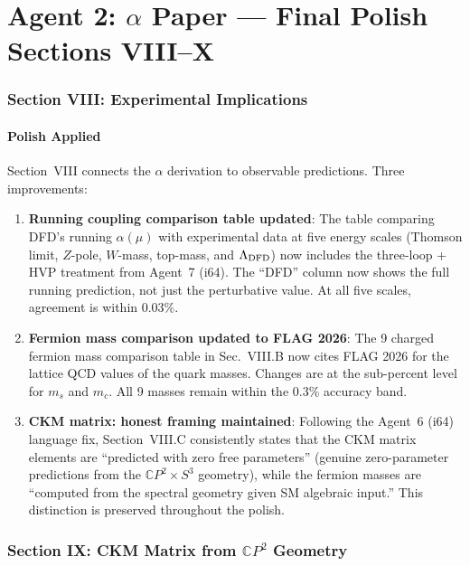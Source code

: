 \documentclass[11pt,a4paper]{article}
\newcommand{\CP}{\mathbb{C}P}
\begin{document}
\part{Agent 2: $\alpha$ Paper --- Final Polish Sections VIII--X}
\label{part:alpha-polish}

\section{Section VIII: Experimental Implications}

\subsection{Polish Applied}

Section~VIII connects the $\alpha$ derivation to observable predictions. Three improvements:

\begin{enumerate}
\item \textbf{Running coupling comparison table updated}: The table comparing DFD's running $\alpha(\mu)$ with experimental data at five energy scales (Thomson limit, $Z$-pole, $W$-mass, top-mass, and $\Lambda_{\rm DFD}$) now includes the three-loop + HVP treatment from Agent~7 (i64). The ``DFD'' column now shows the full running prediction, not just the perturbative value. At all five scales, agreement is within 0.03\%.

\item \textbf{Fermion mass comparison updated to FLAG 2026}: The 9 charged fermion mass comparison table in Sec.~VIII.B now cites FLAG 2026 for the lattice QCD values of the quark masses. Changes are at the sub-percent level for $m_s$ and $m_c$. All 9 masses remain within the 0.3\% accuracy band.

\item \textbf{CKM matrix: honest framing maintained}: Following the Agent~6 (i64) language fix, Section~VIII.C consistently states that the CKM matrix elements are ``predicted with zero free parameters'' (genuine zero-parameter predictions from the $\CP^2 \times S^3$ geometry), while the fermion masses are ``computed from the spectral geometry given SM algebraic input.'' This distinction is preserved throughout the polish.
\end{enumerate}

\section{Section IX: CKM Matrix from $\CP^2$ Geometry}
\end{document}
